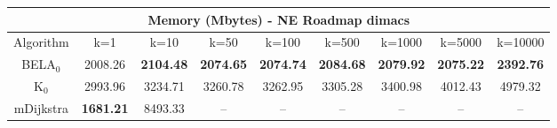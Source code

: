 \begin{tabular}{c|cccccccc}\toprule
\multicolumn{9}{c}{Memory (Mbytes) - NE Roadmap dimacs}\\ \midrule
Algorithm & k=1 & k=10 & k=50 & k=100 & k=500 & k=1000 & k=5000 & k=10000 \\ \midrule
BELA$_0$ & 2008.26 & \textbf{2104.48} & \textbf{2074.65} & \textbf{2074.74} & \textbf{2084.68} & \textbf{2079.92} & \textbf{2075.22} & \textbf{2392.76} \\
K$_0$ & 2993.96 & 3234.71 & 3260.78 & 3262.95 & 3305.28 & 3400.98 & 4012.43 & 4979.32 \\
mDijkstra & \textbf{1681.21} & 8493.33 & -- & -- & -- & -- & -- & -- \\ \bottomrule 
\end{tabular}
